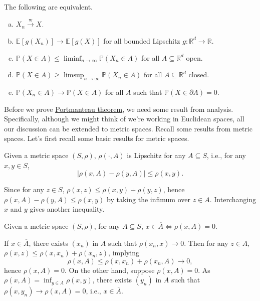 \begin{theorem}\label{thm:Portmanteau}
	The following are equivalent.
	\begin{enumerate}[(a)]
		\item\label{thm:Portmanteau-a} \(X_n \overset{\text{w} }{\to } X\).
		\item\label{thm:Portmanteau-b} \(\mathbb{E}_{}\left[g(X_n) \right] \to \mathbb{E}_{}\left[g(X) \right] \) for all bounded Lipschitz \(g \colon \mathbb{R} ^d \to \mathbb{R} \).
		\item\label{thm:Portmanteau-c} \(\mathbb{P} (X \in A) \leq \liminf_{n \to \infty} \mathbb{P} (X _n \in A)\) for all \(A \subseteq \mathbb{R} ^d\) open.
		\item\label{thm:Portmanteau-d} \(\mathbb{P} (X \in A) \geq \limsup_{n \to \infty} \mathbb{P} (X _n \in A)\) for all \(A \subseteq \mathbb{R} ^d\) closed.
		\item\label{thm:Portmanteau-e} \(\mathbb{P} (X_n \in A) \to \mathbb{P} (X \in A)\) for all \(A\) such that \(\mathbb{P} (X \in \partial A) = 0\).
	\end{enumerate}
\end{theorem}

Before we prove \hyperref[thm:Portmanteau]{Portmanteau theorem}, we need some result from analysis. Specifically, although we might think of we're working in Euclidean spaces, all our discussion can be extended to metric spaces. Recall some results from metric spaces. Let's first recall some basic results for metric spaces.

\begin{claim}
	Given a metric space \((S, \rho )\), \(\rho (\cdot, A)\) is Lipschitz for any \(A \subseteq S\), i.e., for any \(x, y\in S\),
	\[
		\vert \rho (x, A) - \rho (y, A)\vert \leq \rho (x, y).
	\]
\end{claim}
\begin{explanation}
	Since for any \(z\in S\), \(\rho (x, z) \leq \rho (x, y) + \rho (y, z)\), hence \(\rho (x, A) - \rho (y, A) \leq \rho (x, y)\) by taking the infimum over \(z \in A\). Interchanging \(x\) and \(y\) gives another inequality.
\end{explanation}

\begin{claim}
	Given a metric space \((S, \rho )\), for any \(A \subseteq S\), \(x\in \overline{A} \iff \rho (x, A) = 0\).
\end{claim}
\begin{explanation}
	If \(x\in \overline{A} \), there exists \((x_n)\) in \(A\) such that \(\rho (x_n, x) \to 0\). Then for any \(z\in A\), \(\rho (x, z) \leq \rho (x, x_n) + \rho (x_n, z)\), implying
	\[
		\rho (x, A) \leq \rho (x, x_n) + \rho (x_n, A) \to 0,
	\]
	hence \(\rho (x, A) = 0\). On the other hand, suppose \(\rho (x, A) = 0\). As \(\rho (x, A) = \inf _{y\in A} \rho (x, y)\), there exists \((y_n)\) in \(A\) such that \(\rho (x, y_n) \to \rho (x, A) = 0\), i.e., \(x\in \overline{A} \).
\end{explanation}

